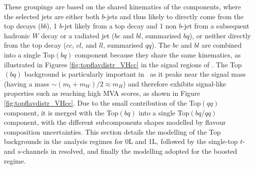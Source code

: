 These groupings are based on the shared kinematics of the components, where the selected jets are either both $b$-jets and thus likely to directly come from the top decays ($bb$), 1 $b$-jet likely from a top decay and 1 non $b$-jet from a subsequent hadronic $W$ decay or a radiated jet ($bc$ and $bl$, summarised $bq$), or neither directly from the top decay ($cc$, $cl$, and $ll$, summarised $qq$). The $bc$ and $bl$ are combined into a single Top$(bq)$ component because they share the same kinematics, as illustrated in Figures \ref{fig:topflavdistr_VHcc} in the signal regions of \vhc. The Top$(bq)$ background is particularly important in \vhc\ as it peaks near the signal mass (having a mass $\sim (m_t + m_W) / 2 \approx m_H$) and therefore exhibits signal-like properties such as reaching high MVA scores, as shown in Figure \ref{fig:topflavdistr_VHcc}. Due to the small contribution of the Top$(qq)$ component, it is merged with the Top$(bq)$ into a single Top$(bq/qq)$ component, with the different subcomponents shapes modelled by flavour composition uncertainties. This section details the modelling of the Top backgrounds in the analysis regimes for 0L and 1L, followed by the single-top $t$- and $s$-channels in resolved, and finally the modelling adopted for the boosted regime.

